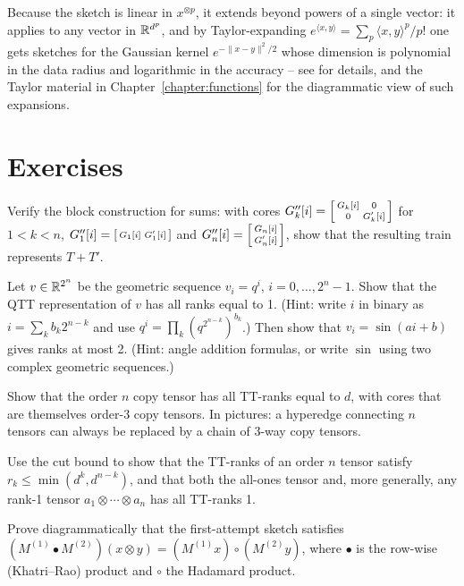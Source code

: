 Because the sketch is linear in $x^{\otimes p}$,
it extends beyond powers of a single vector:
it applies to any vector in $\mathbb R^{d^p}$,
and by Taylor-expanding
$e^{\langle x,y \rangle} = \sum_p \langle x,y\rangle^p / p!$
one gets sketches for the Gaussian kernel
$e^{-\|x-y\|^2/2}$
whose dimension is polynomial in the data radius and logarithmic in the accuracy -- see \cite{ahle_sketching} for details, and the Taylor material in Chapter~\ref{chapter:functions} for the diagrammatic view of such expansions.

\section{Exercises}

\begin{exercise}
\label{ex:tt_sum}
Verify the block construction for sums:
with cores $G''_k[i] = \left[\begin{smallmatrix}G_k[i] & 0 \\ 0 & G'_k[i]\end{smallmatrix}\right]$ for $1 < k < n$,
$G''_1[i] = \left[\begin{smallmatrix}G_1[i] & G'_1[i]\end{smallmatrix}\right]$ and
$G''_n[i] = \left[\begin{smallmatrix}G_n[i] \\ G'_n[i]\end{smallmatrix}\right]$,
show that the resulting train represents $T + T'$.
\end{exercise}

\begin{exercise}
\label{ex:qtt_geometric}
Let $v \in \mathbb R^{2^n}$ be the geometric sequence $v_i = q^i$, $i = 0, \dots, 2^n - 1$.
Show that the QTT representation of $v$ has all ranks equal to 1.
(Hint: write $i$ in binary as $i = \sum_k b_k 2^{n-k}$ and use $q^i = \prod_k (q^{2^{n-k}})^{b_k}$.)
Then show that $v_i = \sin(a i + b)$ gives ranks at most 2.
(Hint: angle addition formulas, or write $\sin$ using two complex geometric sequences.)
\end{exercise}

\begin{exercise}
Show that the order $n$ copy tensor has all TT-ranks equal to $d$,
with cores that are themselves order-3 copy tensors.
In pictures: a hyperedge connecting $n$ tensors can always be replaced by a chain of 3-way copy tensors.
\end{exercise}

\begin{exercise}
Use the cut bound to show that the TT-ranks of an order $n$ tensor satisfy
$r_k \le \min(d^k, d^{n-k})$,
and that both the all-ones tensor and, more generally, any rank-1 tensor $a_1 \otimes \cdots \otimes a_n$ has all TT-ranks 1.
\end{exercise}

\begin{exercise}
Prove diagrammatically that the first-attempt sketch satisfies
$(M^{(1)} \bullet M^{(2)})(x \otimes y) = (M^{(1)} x) \circ (M^{(2)} y)$,
where $\bullet$ is the row-wise (Khatri--Rao) product and $\circ$ the Hadamard product.
\end{exercise}
